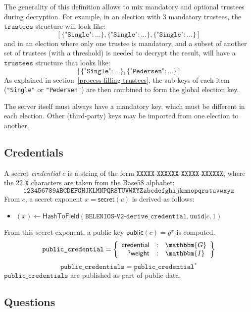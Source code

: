 \documentclass[a4paper]{article}
\newcommand{\dstprefix}{BELENIOS-V2}
\newcommand{\G}{\mathbbm{G}}
\newcommand{\I}{\mathbbm{I}}
\newcommand{\public}{\textsf{public}}
\newcommand{\uuid}{\texttt{uuid}}
\begin{document}
The generality of this definition allows to mix mandatory and optional
trustees during decryption. For example, in an election with 3
mandatory trustees, the $\texttt{trustees}$ structure will look like:
\[
  [\{\texttt{"Single"}:\dotsc\},\{\texttt{"Single"}:\dotsc\},\{\texttt{"Single"}:\dotsc\}]
\]
and in an election where only one trustee is mandatory, and a subset
of another set of trustees (with a threshold) is needed to decrypt the
result, will have a $\texttt{trustees}$ structure that looks like:
\[
  [\{\texttt{"Single"}:\dotsc\},\{\texttt{"Pedersen"}:\dotsc\}]
\]
As explained in section~\ref{process-filling-trustees}, the sub-keys
of each item (\texttt{"Single"} or \texttt{"Pedersen"}) are then
combined to form the global election key.

The server itself must always have a mandatory key, which must be
different in each election. Other (third-party) keys may be imported
from one election to another.

\subsection{Credentials}
\label{credentials}

\newcommand{\secret}{\textsf{secret}}

A secret \emph{credential} $c$ is a string of the form
$\texttt{XXXXX-XXXXXX-XXXXX-XXXXXX}$, where the 22 $\texttt{X}$
characters are taken from the Base58 alphabet:
\[\texttt{123456789ABCDEFGHJKLMNPQRSTUVWXYZabcdefghijkmnopqrstuvwxyz}\]
From $c$, a secret exponent $x=\secret(c)$ is derived as follows:
\begin{itemize}
\item $(x)\leftarrow\textsf{HashToField}(\texttt{\dstprefix-derive\_credential},\uuid\texttt{|}c,1)$
\end{itemize}
From this secret exponent, a public key $\public(c)=g^x$ is
computed.
\[
  \texttt{public\_credential}=\left\{
    \begin{array}{rcl}
      \textsf{credential}&:&\G\\
      \textsf{?weight}&:&\I
    \end{array}
  \right\}
\]
\[\texttt{public\_credentials}=\texttt{public\_credential}^\ast\]
$\texttt{public\_credentials}$ are published as part of public data.

\subsection{Questions}
\label{questions}
\end{document}
